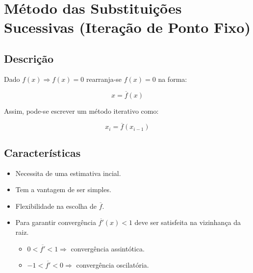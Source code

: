 \section{Método das Substituições Sucessivas (Iteração de Ponto Fixo)}

\subsection{Descrição}

Dado $f(x) \Rightarrow f(x) = 0$ rearranja-se $f(x) = 0$ na forma:

\[
 x = \overline{f}(x)
\]

Assim, pode-se escrever um método iterativo como:

\[
 x_{i} = \overline{f}(x_{i-1})
\]

\subsection{Características}

\begin{itemize}
 \item Necessita de uma estimativa incial.
 \item Tem a vantagem de ser simples.
 \item Flexibilidade na escolha de $\overline{f}$.
 \item Para garantir convergência $\overline{f'}(x) < 1$ deve ser satisfeita na vizinhança da raiz.

\begin{itemize}
 \item $0 < \overline{f'} < 1 \Rightarrow$ convergência assintótica.
 \item $-1 < \overline{f'} < 0 \Rightarrow$ convergência oscilatória.
\end{itemize}

\end{itemize}

